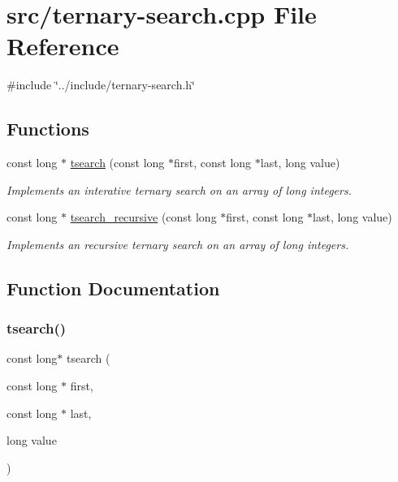 \hypertarget{ternary-search_8cpp}{}\section{src/ternary-\/search.cpp File Reference}
\label{ternary-search_8cpp}
{\ttfamily \#include \char`\"{}../include/ternary-\/search.\+h\char`\"{}}\newline
\subsection*{Functions}
\begin{DoxyCompactItemize}
\item 
const long $\ast$ \mbox{\hyperlink{ternary-search_8cpp_a5d1e6d2319a9d23db3a04557e0811c81}{tsearch}} (const long $\ast$first, const long $\ast$last, long value)
\begin{DoxyCompactList}\small\item\em Implements an interative ternary search on an array of long integers. \end{DoxyCompactList}\item 
const long $\ast$ \mbox{\hyperlink{ternary-search_8cpp_a3c64aebf53564a9b55057f719360e70c}{tsearch\+\_\+recursive}} (const long $\ast$first, const long $\ast$last, long value)
\begin{DoxyCompactList}\small\item\em Implements an recursive ternary search on an array of long integers. \end{DoxyCompactList}\end{DoxyCompactItemize}


\subsection{Function Documentation}
\mbox{\label{ternary-search_8cpp_a5d1e6d2319a9d23db3a04557e0811c81}} 
\subsubsection{\texorpdfstring{tsearch()}{tsearch()}}
{\footnotesize\ttfamily const long$\ast$ tsearch (\begin{DoxyParamCaption}\item[{const long $\ast$}]{first,  }\item[{const long $\ast$}]{last,  }\item[{long}]{value }\end{DoxyParamCaption})}



